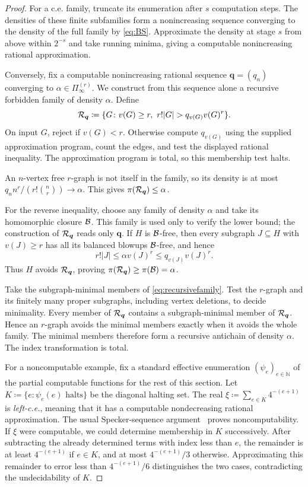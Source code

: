 \documentclass[10pt]{article}
\numberwithin{equation}{section}
\theoremstyle{definition}
\begin{document}
\begin{proof}
For a c.e. family, truncate its enumeration after $s$ computation steps. The densities of these finite subfamilies form a nonincreasing sequence converging to the density of the full family by \eqref{eq:BS}. Approximate the density at stage $s$ from above within $2^{-s}$ and take running minima, giving a computable nonincreasing rational approximation.

Conversely, fix a computable nonincreasing rational sequence $\boldsymbol q=(q_n)$ converging to $\alpha\in\Pi_\infty^{(r)}$. We construct from this sequence alone a recursive forbidden family of density $\alpha$. Define
\begin{equation}\label{eq:recursivefamily}
 \cR_{\boldsymbol q}\coloneqq\{G\colon v(G)\ge r,\ r!|G|>q_{v(G)}v(G)^r\}.
\end{equation}
On input $G$, reject if $v(G)<r$. Otherwise compute $q_{v(G)}$ using the supplied approximation program, count the edges, and test the displayed rational inequality. The approximation program is total, so this membership test halts.

An $n$-vertex free $r$-graph is not itself in the family, so its density is at most $q_n n^r/(r!\binom{n}{r})\to\alpha$. This gives $\pi(\mathcal R_{\boldsymbol q})\le\alpha$.

For the reverse inequality, choose any family of density $\alpha$ and take its homomorphic closure $\mathcal B$. This family is used only to verify the lower bound; the construction of $\mathcal R_{\boldsymbol q}$ reads only $\boldsymbol q$. If $H$ is $\mathcal B$-free, then every subgraph $J\subseteq H$ with $v(J)\ge r$ has all its balanced blowups $\mathcal B$-free, and hence
\[
 r!|J|\le\alpha v(J)^r\le q_{v(J)}v(J)^r.
\]
Thus $H$ avoids $\mathcal R_{\boldsymbol q}$, proving $\pi(\mathcal R_{\boldsymbol q})\ge\pi(\mathcal B)=\alpha$.

Take the subgraph-minimal members of \eqref{eq:recursivefamily}. Test the $r$-graph and its finitely many proper subgraphs, including vertex deletions, to decide minimality. Every member of $\mathcal R_{\boldsymbol q}$ contains a subgraph-minimal member of $\mathcal R_{\boldsymbol q}$. Hence an $r$-graph avoids the minimal members exactly when it avoids the whole family. The minimal members therefore form a recursive antichain of density $\alpha$. The index transformation is total.

For a noncomputable example, fix a standard effective enumeration $(\psi_e)_{e\in\mathbb N}$ of the partial computable functions for the rest of this section. Let $K\coloneqq\{e\colon\psi_e(e)\text{ halts}\}$ be the diagonal halting set. The real $\xi\coloneqq\sum_{e\in K}4^{-(e+1)}$ is \emph{left-c.e.}, meaning that it has a computable nondecreasing rational approximation. The usual Specker-sequence argument~\cite{Specker1949} proves noncomputability. If $\xi$ were computable, we could determine membership in $K$ successively. After subtracting the already determined terms with index less than $e$, the remainder is at least $4^{-(e+1)}$ if $e\in K$, and at most $4^{-(e+1)}/3$ otherwise. Approximating this remainder to error less than $4^{-(e+1)}/6$ distinguishes the two cases, contradicting the undecidability of $K$.


\end{proof}
\end{document}
